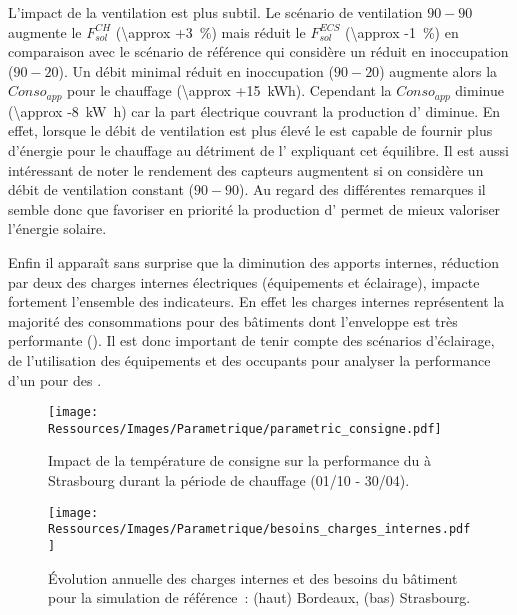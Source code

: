 L’impact de la ventilation est plus subtil. Le scénario de ventilation $90-90$
augmente le $F_{sol}^{CH}$ (\SI{\approx +3}{\percent}) mais réduit le $F_{sol}^{ECS}$
(\SI{\approx -1}{\percent}) en comparaison avec le scénario de référence qui considère un
réduit en inoccupation ($90-20$). Un débit minimal réduit en inoccupation ($90-20$) augmente
alors la $Conso_{app}$ pour le chauffage (\SI{\approx +15}{kWh}). Cependant la
$Conso_{app}$ diminue (\SI{\approx -8}{\kilo\watt\hour}) car la part
électrique couvrant la production d’ diminue. En effet, lorsque le débit de ventilation
est plus élevé le  est capable de fournir plus d’énergie pour le chauffage au
détriment de l’ expliquant cet équilibre. Il est aussi intéressant de noter le
rendement des capteurs augmentent si on considère un débit de ventilation constant
($90-90$). Au regard des différentes remarques il semble donc que
favoriser en priorité la production d’ permet de mieux valoriser l’énergie solaire.

Enfin il apparaît sans surprise que la diminution des apports internes, réduction par deux
des charges internes électriques (équipements et éclairage), impacte fortement l’ensemble
des indicateurs. En effet les charges internes représentent la majorité des consommations
pour des bâtiments dont l’enveloppe est très performante ().
Il est donc important de tenir compte des scénarios d’éclairage, de l’utilisation des
équipements et des occupants pour analyser la performance d’un  pour des
.

\begin{figure}
    \centering
    \texttt{[image: Ressources/Images/Parametrique/parametric\_consigne.pdf]}
    \caption[Impact de la température de consigne sur la performance du ]
            {Impact de la température de consigne sur la performance
             du  à Strasbourg durant la période de chauffage (01/10 - 30/04).}
    \label{fig:impact_temp_consigne}
\end{figure}

\begin{figure}
    \centering
    \texttt{[image: Ressources/Images/Parametrique/besoins\_charges\_internes.pdf]}
    \caption[Évolution annuelle des charges internes et des besoins du bâtiment]
            {Évolution annuelle des charges internes et des besoins du bâtiment
             pour la simulation de référence~: (haut) Bordeaux, (bas) Strasbourg.}
    \label{fig:besoins_charges_internes}
\end{figure}


